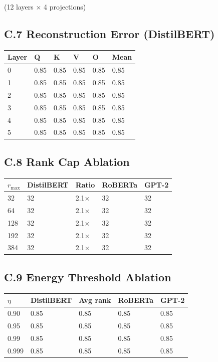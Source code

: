 (12 layers $\times$ 4 projections)

\subsection{C.7 Reconstruction Error (DistilBERT)}

\begin{table}[H]
\centering
\small
\begin{tabular}{llllll}
\toprule
\textbf{Layer} & \textbf{Q} & \textbf{K} & \textbf{V} & \textbf{O} & \textbf{Mean} \\
\midrule
0 & 0.85 & 0.85 & 0.85 & 0.85 & 0.85 \\
1 & 0.85 & 0.85 & 0.85 & 0.85 & 0.85 \\
2 & 0.85 & 0.85 & 0.85 & 0.85 & 0.85 \\
3 & 0.85 & 0.85 & 0.85 & 0.85 & 0.85 \\
4 & 0.85 & 0.85 & 0.85 & 0.85 & 0.85 \\
5 & 0.85 & 0.85 & 0.85 & 0.85 & 0.85 \\
\bottomrule
\end{tabular}
\end{table}

\subsection{C.8 Rank Cap Ablation}

\begin{table}[H]
\centering
\small
\begin{tabular}{lllll}
\toprule
\textbf{$r_\text{max}$} & \textbf{DistilBERT} & \textbf{Ratio} & \textbf{RoBERTa} & \textbf{GPT-2} \\
\midrule
32 & 32 & 2.1$\times$ & 32 & 32 \\
64 & 32 & 2.1$\times$ & 32 & 32 \\
128 & 32 & 2.1$\times$ & 32 & 32 \\
192 & 32 & 2.1$\times$ & 32 & 32 \\
384 & 32 & 2.1$\times$ & 32 & 32 \\
\bottomrule
\end{tabular}
\end{table}

\subsection{C.9 Energy Threshold Ablation}

\begin{table}[H]
\centering
\small
\begin{tabular}{lllll}
\toprule
\textbf{$\eta$} & \textbf{DistilBERT} & \textbf{Avg rank} & \textbf{RoBERTa} & \textbf{GPT-2} \\
\midrule
0.90 & 0.85 & 0.85 & 0.85 & 0.85 \\
0.95 & 0.85 & 0.85 & 0.85 & 0.85 \\
0.99 & 0.85 & 0.85 & 0.85 & 0.85 \\
0.999 & 0.85 & 0.85 & 0.85 & 0.85 \\
\bottomrule
\end{tabular}
\end{table}

